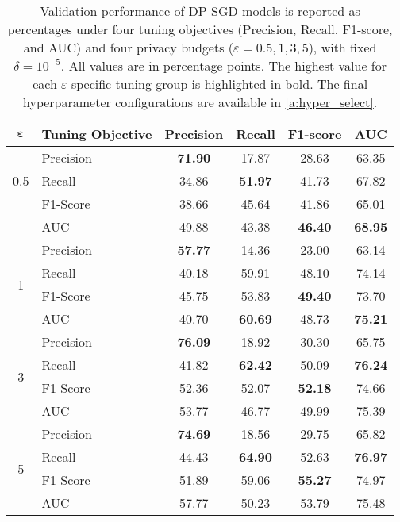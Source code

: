 \begin{table}[!t]
    \centering
    \caption{Validation performance (\%) of DP-SGD models under different tuning objectives and privacy levels ($\delta = 10^{-5}$)}
    \label{tab:dpsgd-validation}
    \begin{tabular}{clcccc}
    \toprule
    $\boldsymbol{\varepsilon}$ & \textbf{Tuning Objective} & \textbf{Precision} & \textbf{Recall} & \textbf{F1-score} & \textbf{AUC} \\
    \midrule
    \multirow[t]{3}{*}{0.5}
    & Precision  & \textbf{71.90} & 17.87 & 28.63 & 63.35 \\
    & Recall     & 34.86 & \textbf{51.97} & 41.73 & 67.82 \\
    & F1-Score   & 38.66 & 45.64 & 41.86 & 65.01 \\
    & AUC        & 49.88 & 43.38 & \textbf{46.40} & \textbf{68.95} \\
    \midrule
    \multirow[t]{4}{*}{1}
    & Precision  & \textbf{57.77} & 14.36 & 23.00 & 63.14 \\
    & Recall     & 40.18 & 59.91 & 48.10 & 74.14 \\
    & F1-Score   & 45.75 & 53.83 & \textbf{49.40} & 73.70 \\
    & AUC        & 40.70 & \textbf{60.69} & 48.73 & \textbf{75.21} \\
    \midrule
    \multirow[t]{4}{*}{3} 
    & Precision  & \textbf{76.09} & 18.92 & 30.30 & 65.75 \\
    & Recall     & 41.82 & \textbf{62.42} & 50.09 & \textbf{76.24} \\
    & F1-Score   & 52.36 & 52.07 & \textbf{52.18} & 74.66 \\
    & AUC        & 53.77 & 46.77 & 49.99 & 75.39 \\
    \midrule
    \multirow[t]{4}{*}{5} 
    & Precision  & \textbf{74.69} & 18.56 & 29.75 & 65.82 \\
    & Recall     & 44.43 & \textbf{64.90} & 52.63 & \textbf{76.97} \\
    & F1-Score   & 51.89 & 59.06 & \textbf{55.27} & 74.97 \\
    & AUC        & 57.77 & 50.23 & 53.79 & 75.48 \\
    \bottomrule
    \end{tabular}
    \vspace{2mm}
    \caption*{\footnotesize Validation performance of DP-SGD models is reported as percentages under four tuning objectives (Precision, Recall, F1-score, and AUC) and four privacy budgets ($\varepsilon = 0.5, 1, 3, 5$), with fixed $\delta = 10^{-5}$. All values are in percentage points. The highest value for each $\varepsilon$-specific tuning group is highlighted in bold. The final hyperparameter configurations are available in \ref{a:hyper_select}.}
\end{table}